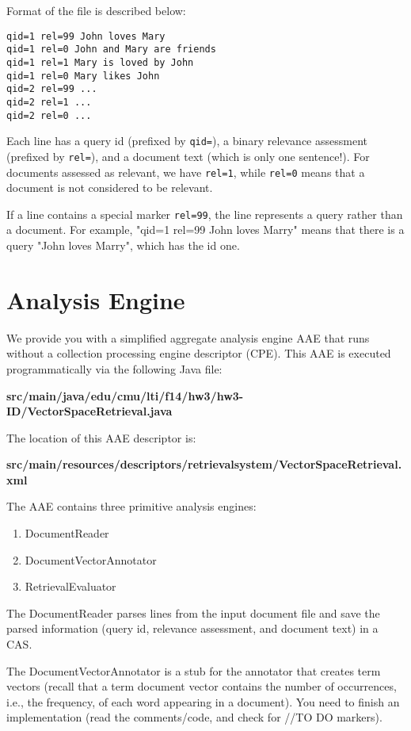 \documentclass[oneside,11pt]{book}
\begin{document}
Format of the file is described below:

\begin{verbatim}
qid=1 rel=99 John loves Mary 
qid=1 rel=0 John and Mary are friends
qid=1 rel=1 Mary is loved by John
qid=1 rel=0 Mary likes John
qid=2 rel=99 ...
qid=2 rel=1 ...
qid=2 rel=0 ...
\end{verbatim}

Each line has a query id (prefixed by \texttt{qid=}), 
a binary relevance assessment (prefixed by \texttt{rel=}), 
and a document text (which is only one sentence!). 
For documents assessed as relevant, we have \texttt{rel=1},
while \texttt{rel=0} means that a document is not considered to be relevant.

If a line contains a special marker \texttt{rel=99},
the line represents a query rather than a document.
For example, "qid=1 rel=99 John loves Marry" means
that there is a query "John loves Marry", which has the id one.

\section{Analysis Engine}
\label{SectionAe}
We provide you with a simplified aggregate analysis engine AAE that runs without 
a collection processing engine descriptor (CPE).
This AAE is executed programmatically via the following Java file:

\begin{center}\textbf{src/main/java/edu/cmu/lti/f14/hw3/hw3-ID/VectorSpaceRetrieval.java} \end{center}

The location of this AAE descriptor is:

\begin{center}\textbf{src/main/resources/descriptors/retrievalsystem/VectorSpaceRetrieval.xml} \end{center}

The AAE contains three primitive analysis engines:
\begin{enumerate}
\item DocumentReader
\item DocumentVectorAnnotator
\item RetrievalEvaluator
\end{enumerate}

The DocumentReader parses lines from the input document file and save the parsed information (query id, relevance assessment, and document text) in a CAS.

The DocumentVectorAnnotator is a stub for the annotator that creates term vectors
(recall that a term document vector contains the number of occurrences, i.e., the frequency,
of each word appearing in a document). 
You need to finish an implementation (read the comments/code, and check for //TO DO markers).
\end{document}
